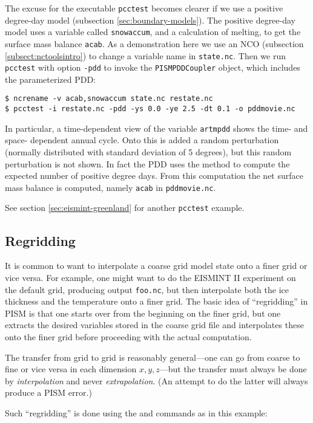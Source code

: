 The excuse for the executable \verb|pcctest| becomes clearer if we use a positive degree-day
model (subsection \ref{sec:boundary-models}).  The positive degree-day
model uses a variable called \verb|snowaccum|, and a calculation of melting, to get the
surface mass balance \verb|acab|.  As a demonstration here we use an NCO (subsection 
\ref{subsect:nctoolsintro}) to change a variable name in \verb|state.nc|.  Then we run \verb|pcctest|
with option \verb|-pdd| to invoke the \verb|PISMPDDCoupler|
object, which includes the parameterized PDD:
\begin{verbatim}
$ ncrename -v acab,snowaccum state.nc restate.nc
$ pcctest -i restate.nc -pdd -ys 0.0 -ye 2.5 -dt 0.1 -o pddmovie.nc
\end{verbatim}
In particular, a time-dependent view of the variable \verb|artmpdd| shows the time- and space-
dependent annual cycle.  Onto this is added a random perturbation (normally distributed with standard 
deviation of 5 degrees), but this random perturbation is not shown.  In fact the PDD uses the
\cite{CalovGreve05} method to compute the expected number of positive degree days.  From this
computation the net surface mass balance is computed, namely \verb|acab| in \verb|pddmovie.nc|.

See section \ref{sec:eismint-greenland} for another \verb|pcctest| example.

\subsection{Regridding}  It is common to want to interpolate a coarse grid model state onto a finer grid or vice versa.  For example, one might want to do the EISMINT II experiment on the default grid, producing output \verb|foo.nc|, but then interpolate both the ice thickness and the temperature onto a finer grid.  The basic idea of ``regridding'' in PISM is that one starts over from the beginning on the finer grid, but one extracts the desired variables stored in the coarse grid file and interpolates these onto the finer grid before proceeding with the actual computation.

The transfer from grid to grid is reasonably general---one can go from coarse to fine or vice versa in each dimension $x,y,z$---but the transfer must always be done by \emph{interpolation} and never \emph{extrapolation}.  (An attempt to do the latter will always produce a PISM error.)

Such ``regridding'' is done using the  and  commands as in this example:

